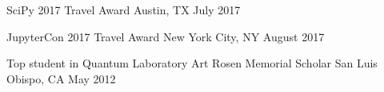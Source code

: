 
\begin{cvpoints}

  \cvpoint
    {SciPy 2017} %
    {Travel Award} %
    {Austin, TX} %
    {July 2017} %

  \cvpoint
    {JupyterCon 2017} %
    {Travel Award} %
    {New York City, NY} %
    {August 2017} %

  \cvpoint
    {Top student in Quantum Laboratory} %
    {Art Rosen Memorial Scholar} %
    {San Luis Obispo, CA} %
    {May 2012} %

\end{cvpoints}
